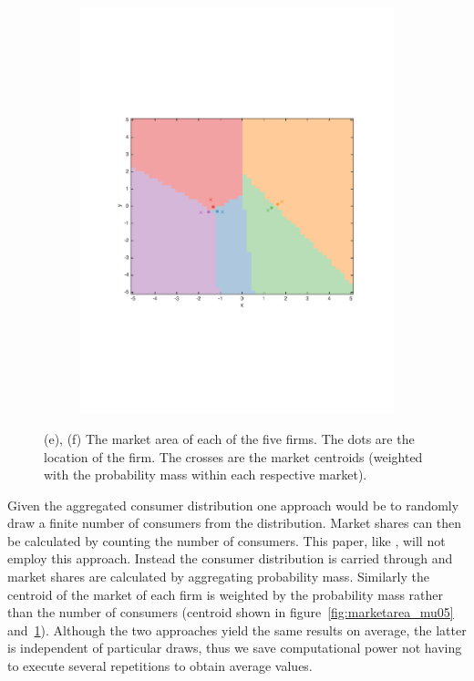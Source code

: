 \documentclass[preprint, 12pt]{elsarticle}
\begin{document}
\begin{figure}[htp!]
\begin{subfigure}[t]{0.45\textwidth}
		\includegraphics[width=\textwidth, trim={15mm 75mm 20mm 75mm}]{Graphics/marketarea_mu15_nratio2.pdf}
		\caption[.]{}
		\label{fig:marketarea_mu15}
	\end{subfigure}
	\caption*{(e), (f) The market area of each of the five firms. The dots are the location of the firm. The crosses are the market centroids (weighted with the probability mass within each respective market).}
	
	\label{fig:distribution}
\end{figure}

Given the aggregated consumer distribution one approach would be to randomly draw a finite number of consumers from the distribution. Market shares can then be calculated by counting the number of consumers. This paper, like \citet{Laver_Sergenti_2011}, will not employ this approach. Instead the consumer distribution is carried through and market shares are calculated by aggregating probability mass. Similarly the centroid of the market of each firm is weighted by the probability mass rather than the number of consumers (centroid shown in figure~\ref{fig:marketarea_mu05} and~\ref{fig:marketarea_mu15}). Although the two approaches yield the same results on average, the latter is independent of particular draws, thus we save computational power not having to execute several repetitions to obtain average values.
\end{document}
